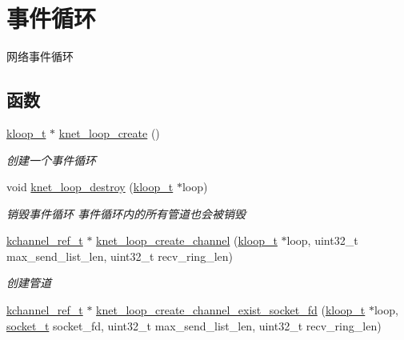 \hypertarget{a00133}{}\section{事件循环}
\label{a00133}


网络事件循环  


\subsection*{函数}
\begin{DoxyCompactItemize}
\item 
\hyperlink{a00066_a97fc76209a58362019f1ded9169e397f_a97fc76209a58362019f1ded9169e397f}{kloop\+\_\+t} $\ast$ \hyperlink{a00133_ga2e4181ebe9c1769be90bb8dc0e5cdffe_ga2e4181ebe9c1769be90bb8dc0e5cdffe}{knet\+\_\+loop\+\_\+create} ()
\begin{DoxyCompactList}\small\item\em 创建一个事件循环 \end{DoxyCompactList}\item 
void \hyperlink{a00133_ga390ea3161f935d0d3a411df8752d8b9f_ga390ea3161f935d0d3a411df8752d8b9f}{knet\+\_\+loop\+\_\+destroy} (\hyperlink{a00066_a97fc76209a58362019f1ded9169e397f_a97fc76209a58362019f1ded9169e397f}{kloop\+\_\+t} $\ast$loop)
\begin{DoxyCompactList}\small\item\em 销毁事件循环 事件循环内的所有管道也会被销毁 \end{DoxyCompactList}\item 
\hyperlink{a00066_a3b7e82599367eade261456f60ebe2cd9_a3b7e82599367eade261456f60ebe2cd9}{kchannel\+\_\+ref\+\_\+t} $\ast$ \hyperlink{a00133_gac1f9a4848c06c2a6a2723d7b991b4394_gac1f9a4848c06c2a6a2723d7b991b4394}{knet\+\_\+loop\+\_\+create\+\_\+channel} (\hyperlink{a00066_a97fc76209a58362019f1ded9169e397f_a97fc76209a58362019f1ded9169e397f}{kloop\+\_\+t} $\ast$loop, uint32\+\_\+t max\+\_\+send\+\_\+list\+\_\+len, uint32\+\_\+t recv\+\_\+ring\+\_\+len)
\begin{DoxyCompactList}\small\item\em 创建管道 \end{DoxyCompactList}\item 
\hyperlink{a00066_a3b7e82599367eade261456f60ebe2cd9_a3b7e82599367eade261456f60ebe2cd9}{kchannel\+\_\+ref\+\_\+t} $\ast$ \hyperlink{a00133_gaddfd5a2709d0c26ada8a2dd3fd6a5b62_gaddfd5a2709d0c26ada8a2dd3fd6a5b62}{knet\+\_\+loop\+\_\+create\+\_\+channel\+\_\+exist\+\_\+socket\+\_\+fd} (\hyperlink{a00066_a97fc76209a58362019f1ded9169e397f_a97fc76209a58362019f1ded9169e397f}{kloop\+\_\+t} $\ast$loop, \hyperlink{a00066_a0d9e0afbf02fb6ed6c5b1415dce51b05_a0d9e0afbf02fb6ed6c5b1415dce51b05}{socket\+\_\+t} socket\+\_\+fd, uint32\+\_\+t max\+\_\+send\+\_\+list\+\_\+len, uint32\+\_\+t recv\+\_\+ring\+\_\+len)

\end{DoxyCompactItemize}
